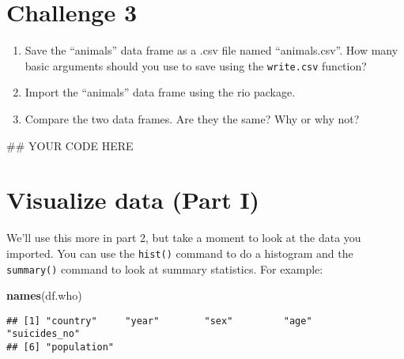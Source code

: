 \documentclass[]{article}
\newenvironment{Shaded}{\begin{snugshade}}{\end{snugshade}}
\newcommand{\KeywordTok}[1]{\textcolor[rgb]{0.13,0.29,0.53}{\textbf{#1}}}
\newcommand{\OperatorTok}[1]{\textcolor[rgb]{0.81,0.36,0.00}{\textbf{#1}}}
\newcommand{\NormalTok}[1]{#1}
\providecommand{\tightlist}{%
  \setlength{\itemsep}{0pt}\setlength{\parskip}{0pt}}
\begin{document}
\section{\texorpdfstring{\textbf{Challenge
3}}{Challenge 3}}\label{challenge-3}

\begin{enumerate}
\def\labelenumi{\arabic{enumi}.}
\tightlist
\item
  Save the ``animals'' data frame as a .csv file named ``animals.csv''.
  How many basic arguments should you use to save using the
  \texttt{write.csv} function?
\item
  Import the ``animals'' data frame using the rio package.
\item
  Compare the two data frames. Are they the same? Why or why not?
\end{enumerate}

\begin{Shaded}
\begin{Highlighting}[]
\NormalTok{## YOUR CODE HERE}
\end{Highlighting}
\end{Shaded}

\section{Visualize data (Part I)}\label{visualize-data-part-i}

We'll use this more in part 2, but take a moment to look at the data you
imported. You can use the \texttt{hist()} command to do a histogram and
the \texttt{summary()} command to look at summary statistics. For
example:

\begin{Shaded}
\begin{Highlighting}[]
\KeywordTok{names}\NormalTok{(df.who)}
\end{Highlighting}
\end{Shaded}

\begin{verbatim}
## [1] "country"     "year"        "sex"         "age"         "suicides_no"
## [6] "population"
\end{verbatim}

\begin{Shaded}
\end{Shaded}
\end{document}

